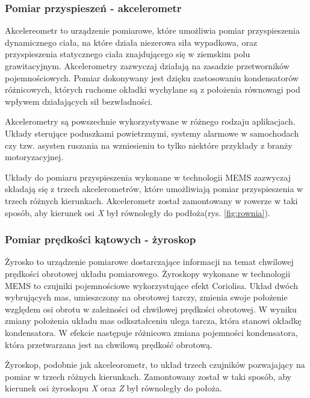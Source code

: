 \subsubsection{Pomiar przyspieszeń - akcelerometr}
Akcelereometr to urządzenie pomiarowe, które umożliwia pomiar przyspieszenia dynamicznego ciała, na które działa niezerowa siła wypadkowa, oraz przyspieszenia statycznego ciała znajdującego się w ziemskim polu grawitacyjnym. Akcelerometry zazwyczaj działają na zasadzie przetworników pojemnościowych. Pomiar dokonywany jest dzięku zastosowaniu kondensatorów różnicowych, których ruchome okładki wychylane są z położenia równowagi pod wpływem działających sił bezwładności.

Akcelerometry są powszechnie wykorzystywane w różnego rodzaju aplikacjach. Układy sterujące poduszkami powietrznymi, systemy alarmowe w samochodach czy tzw. asysten ruszania na wzniesieniu to tylko niektóre przykłady z branży motoryzacyjnej\cite{stAkcel}.

Układy do pomiaru przyspieszenia wykonane w technologii MEMS zazwyczaj składają się z trzech akcelerometrów, które umożliwiają pomiar przyspieszenia w trzech różnych kierunkach. Akcelerometr został zamontowany w rowerze w taki sposób, aby kierunek osi \textit{X} był równoległy do podłoża(rys. \ref{fig:rownia}).
\subsubsection{Pomiar prędkości kątowych - żyroskop}
Żyrosko to urządzenie pomiarowe dostarczające informacji na temat chwilowej prędkości obrotowej układu pomiarowego. Żyroskopy wykonane w technologii MEMS to czujniki pojemnościowe wykorzystujące efekt Coriolisa. Układ dwóch wybrujących mas, umieszczony na obrotowej tarczy, zmienia swoje położenie względem osi obrotu w zależności od chwilowej prędkości obrotowej. W wyniku zmiany położenia układu mas odkształceniu ulega tarcza, która stanowi okładkę kondensatora. W efekcie następuje różnicowa zmiana pojemności kondensatora, która przetwarzana jest na chwilową prędkość obrotową.

Żyroskop, podobnie jak akceleorometr, to układ trzech czujników pozwajający na pomiar w trzech różnych kierunkach. Zamontowany został w taki sposób, aby kierunek osi żyroskopu \textit{X} oraz \textit{Z}  był równoległy do położa.


